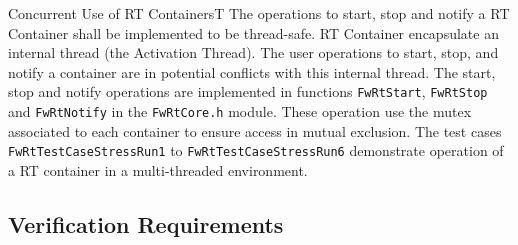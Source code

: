 \documentclass[requirements]{../fwprofile}
\begin{document}
\begin{fw_req}{Concurrent Use of RT Containers}{T}
{The operations to start, stop and notify a RT Container shall be implemented to be thread-safe.}
{RT Container encapsulate an internal thread (the Activation Thread). The user operations to start, stop, and notify a container are in potential conflicts with this internal thread.}
{The start, stop and notify operations are implemented in functions \texttt{FwRtStart}, \texttt{FwRtStop} and \texttt{FwRtNotify} in the \texttt{FwRtCore.h} module. These operation use the mutex associated to each container to ensure access in mutual exclusion.} 
{The test cases \texttt{FwRtTestCaseStressRun1} to \texttt{FwRtTestCaseStressRun6} demonstrate operation of a RT container in a multi-threaded environment.}
\end{fw_req}



\subsection{Verification Requirements}\label{req:verificationReqs}
\end{document}
